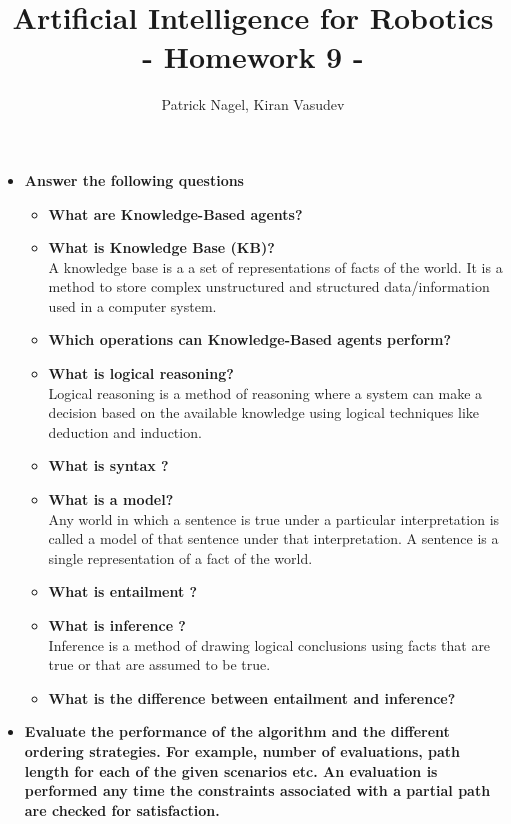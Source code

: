 \documentclass[11pt]{article}
\title{Artificial Intelligence for Robotics\\
- Homework 9 -}
\author{Patrick Nagel, Kiran Vasudev}
\date{}
\begin{document}
	\maketitle
\begin{itemize}
	\item \textbf{Answer the following questions}
	\begin{itemize}
		\item \textbf{What are Knowledge-Based agents?}\\
		\item \textbf{What is Knowledge Base (KB)?}\\
		A knowledge base is a a set of representations of facts of the world. It is a method to store complex unstructured and structured data/information used in a computer system. 
		\item \textbf{Which operations can Knowledge-Based agents perform?}\\
		\item \textbf{What is logical reasoning?}\\
		Logical reasoning is a method of reasoning where a system can make a decision based on the available knowledge using logical techniques like deduction and induction.
		\item \textbf{What is syntax ?}\\
		\item \textbf{What is a model?}\\
		Any world in which a sentence is true under a particular interpretation is called a model of that sentence under that interpretation.	A sentence is a single representation of a fact of the world.
		\item \textbf{What is entailment ?}\\
		\item \textbf{What is inference ?}\\
		Inference is a method of drawing logical conclusions using facts that are true or that are assumed to be true.
		\item \textbf{What is the difference between entailment and inference?}\\
	\end{itemize}
	
	
	\newpage
	
	
	\item \textbf{Evaluate the performance of the algorithm and the different ordering strategies. For example, number of evaluations, path length for each of the given scenarios etc. An evaluation is performed any time the constraints associated with a partial path are checked
		for satisfaction.}
			
\end{itemize}
\end{document}
